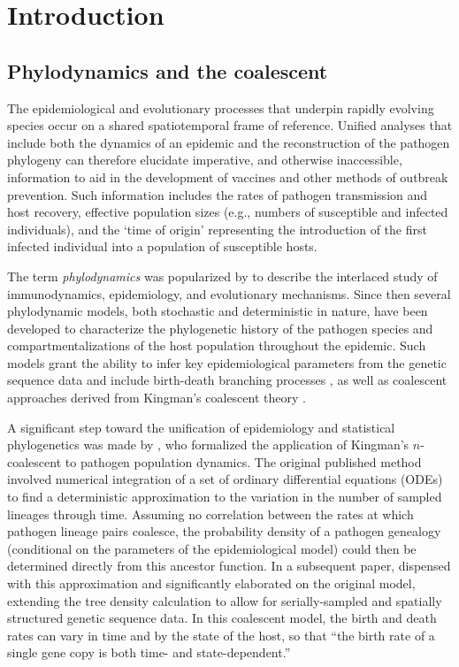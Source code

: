 \documentclass[12pt,titlepage]{article}
\begin{document}
\section{Introduction}

\subsection{Phylodynamics and the coalescent}

The epidemiological and evolutionary processes that underpin rapidly evolving 
species occur on a shared spatiotemporal frame of reference.  Unified analyses 
that include both the dynamics of an epidemic and the reconstruction of the pathogen phylogeny can 
therefore elucidate imperative, and otherwise inaccessible, information to aid in the 
development of vaccines and other methods of outbreak prevention.  Such information 
includes the rates of pathogen transmission and host recovery, effective population sizes 
(e.g., numbers of susceptible and infected individuals), and the `time of origin' representing the 
introduction of the first infected individual into a population of susceptible hosts.

The term \textit{phylodynamics} was popularized by \cite{Grenfell16012004} to describe the interlaced study of immunodynamics, 
epidemiology, and evolutionary mechanisms.  Since then several phylodynamic models, both 
stochastic and deterministic in nature, have been developed to characterize the 
phylogenetic history of the pathogen species and compartmentalizations of the host 
population throughout the epidemic.  Such models grant the ability to infer 
key epidemiological parameters from the genetic sequence data and include birth-death 
branching processes \citep{Stadler:2012,Stadler:2013,Kuhnert:2014,gavryushkina2014bayesian}, as well as 
coalescent approaches \citep{GriffithsandTavare:1994,Pybus22062001, KoelleandRasmussen, Rasmussen2011, DearloveandWilson,Rasmussen2014} derived from 
Kingman's coalescent theory \citep{Kingman:1982}.

A significant step toward the unification of epidemiology and
statistical phylogenetics was made by \cite{Volz:2009}, who formalized
the application of Kingman's $n$-coalescent to pathogen population
dynamics. The original published method involved numerical integration
of a set of ordinary differential equations (ODEs) to find a
deterministic approximation to the variation in the number of sampled
lineages through time. Assuming no correlation between the rates at
which pathogen lineage pairs coalesce, the probability density of a
pathogen genealogy (conditional on the parameters of the
epidemiological model) could then be determined directly from this
ancestor function.  In a subsequent paper, \cite{Volz:2012} dispensed
with this approximation and significantly elaborated on the original
model, extending the tree density calculation to allow for
serially-sampled and spatially structured genetic sequence data.  In
this coalescent model, the birth and death rates can vary in time and
by the state of the host, so that ``the birth rate of a single gene
copy is both time- and state-dependent.''
\end{document}
